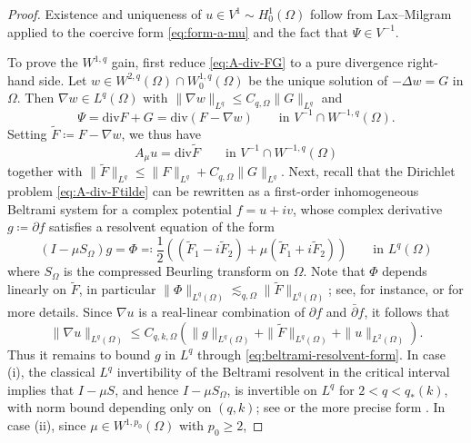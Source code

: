\documentclass[12pt,leqno]{amsart}
\theoremstyle{definition}
\numberwithin{equation}{section}
\numberwithin{figure}{section}
\begin{document}
\begin{proof}
Existence and uniqueness of $u\in V^1\sim H^{1}_{0}(\Omega)$ follow from Lax--Milgram applied to the
coercive form \eqref{eq:form-a-mu} and the fact that $\Psi\in V^{-1}$.

To prove the $W^{1,q}$ gain, first reduce \eqref{eq:A-div-FG} to a pure divergence right-hand side.
Let $w\in W^{2,q}(\Omega)\cap W^{1,q}_{0}(\Omega)$ be the unique solution of $-\Delta w=G$ in $\Omega$.
Then $\nabla w\in L^{q}(\Omega)$ with $\|\nabla w\|_{L^{q}}\le C_{q,\Omega}\|G\|_{L^{q}}$ and
\[
\Psi=
\mathrm{div}F+G=\mathrm{div}\left(F-\nabla w\right)\qquad\text{in }V^{-1}\cap W^{-1,q}(\Omega).\]
Setting $\widetilde F\coloneqq F-\nabla w$, we thus have
\begin{equation}\label{eq:A-div-Ftilde}
A_{\mu}u=\mathrm{div}\widetilde F\qquad\text{in }V^{-1}\cap W^{-1,q}(\Omega)
\end{equation}
together with $\|\widetilde F\|_{L^{q}}\le \|F\|_{L^{q}}+C_{q,\Omega}\|G\|_{L^{q}}$.
Next, recall that  the Dirichlet problem
\eqref{eq:A-div-Ftilde} can be rewritten as a first-order inhomogeneous Beltrami system for a complex
potential $f=u+iv$, whose complex derivative $g\coloneqq \partial f$ satisfies a resolvent equation of the form
\begin{equation}\label{eq:beltrami-resolvent-form}
(I-\mu S_\Omega)g=\Phi\eqcolon \frac12\left((\widetilde F_1-i\widetilde F_2)+\mu(\widetilde F_1+i\widetilde F_2)\right)\qquad\text{in } L^q(\Omega)
\end{equation}
where $S_\Omega$ is the compressed Beurling transform on $\Omega$. Note that 
$\Phi$ depends linearly on $\widetilde F$, in particular $\|\Phi\|_{L^{q}(\Omega)}\lesssim_{q,\Omega}\|\widetilde F\|_{L^{q}(\Omega)}$; see, for instance, \cite[Ch.~16]{AIM} or \cite[\S3.2]{DPF} for more details.
Since $\nabla u$ is a real-linear combination of $\partial f$ and $\bar\partial f$,  it follows that
\begin{equation}\label{eq:grad-u-by-g}
\|\nabla u\|_{L^{q}(\Omega)}\le C_{q,k,\Omega}\left(\|g\|_{L^{q}(\Omega)}+\|\widetilde F\|_{L^{q}(\Omega)}+\|u\|_{L^{2}(\Omega)}\right).
\end{equation}
Thus it remains to bound $g$ in $L^{q}$ through \eqref{eq:beltrami-resolvent-form}.
In case \textup{(i)}, the classical $L^{q}$ invertibility of the Beltrami resolvent in the critical interval
implies that $I-\mu S$, and hence $I-\mu S_\Omega$, is invertible on $L^{q}$ for $2<q<q_\ast(k)$, with norm bound depending
only on $(q,k)$; see \cite[Theorem~14.0.4]{AIM} or the more precise form \cite[Lemma 2.3]{DPF}. In case \textup{(ii)}, since $\mu\in W^{1,p_0}(\Omega)$ with $p_0\ge2$,

\end{proof}
\end{document}
